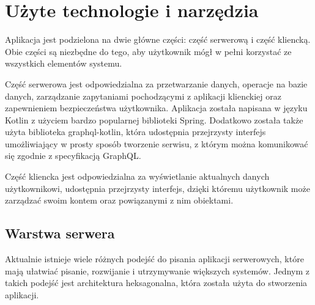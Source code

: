 \newpage
\section{Użyte technologie i narzędzia}
Aplikacja jest podzielona na dwie główne części: część serwerową i część kliencką. Obie części są niezbędne do tego, aby użytkownik mógł w pełni korzystać ze wszystkich elementów systemu.

Część serwerowa jest odpowiedzialna za przetwarzanie danych, operacje na bazie danych, zarządzanie zapytaniami pochodzącymi z aplikacji klienckiej oraz zapewnieniem bezpieczeństwa użytkownika. Aplikacja została napisana w języku Kotlin z użyciem bardzo popularnej biblioteki Spring. Dodatkowo została także użyta biblioteka graphql-kotlin, która udostępnia przejrzysty interfejs umożliwiający w prosty sposób tworzenie serwisu, z którym można komunikować się zgodnie z specyfikacją GraphQL.


Część kliencka jest odpowiedzialna za wyświetlanie aktualnych danych użytkownikowi, udostępnia przejrzysty interfejs, dzięki któremu użytkownik może zarządzać swoim kontem oraz powiązanymi z nim obiektami.


\subsection{Warstwa serwera}
Aktualnie istnieje wiele różnych podejść do pisania aplikacji serwerowych, które mają ułatwiać pisanie, rozwijanie i utrzymywanie większych systemów. Jednym z takich podejść jest architektura heksagonalna, która została użyta do stworzenia aplikacji.
